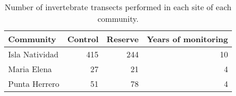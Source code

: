 \begin{table}[t]

\caption{\label{tab:}Number of invertebrate transects performed in each site of each community.}
\centering
\begin{tabular}{lrrr}
\toprule
Community & Control & Reserve & Years of monitoring\\
\midrule
Isla Natividad & 415 & 244 & 10\\
Maria Elena & 27 & 21 & 4\\
Punta Herrero & 51 & 78 & 4\\
\bottomrule
\end{tabular}
\end{table}